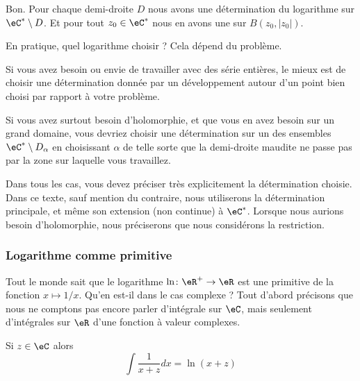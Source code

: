 Bon. Pour chaque demi-droite \( D\) nous avons une détermination du logarithme sur \( \eC^*\setminus D\). Et pour tout \( z_0\in \eC^*\) nous en avons une sur \( B(z_0,| z_0 |)\).

En pratique, quel logarithme choisir ? Cela dépend du problème.

Si vous avez besoin ou envie de travailler avec des série entières, le mieux est de choisir une détermination donnée par un développement autour d'un point bien choisi par rapport à votre problème.

Si vous avez surtout besoin d'holomorphie, et que vous en avez besoin sur un grand domaine, vous devriez choisir une détermination sur un des ensembles \( \eC^*\setminus D_{\alpha}\) en choisissant \( \alpha\) de telle sorte que la demi-droite maudite ne passe pas par la zone sur laquelle vous travaillez.

Dans tous les cas, vous devez préciser très explicitement la détermination choisie. Dans ce texte, sauf mention du contraire, nous utiliserons la détermination principale, et même son extension (non continue) à \( \eC^*\). Lorsque nous aurions besoin d'holomorphie, nous préciserons que nous considérons la restriction.

\subsubsection{Logarithme comme primitive}

Tout le monde sait que le logarithme \( \ln\colon \eR^+\to \eR\) est une primitive de la fonction \( x\mapsto 1/x\). Qu'en est-il dans le cas complexe ? Tout d'abord précisons que nous ne comptons pas encore parler d'intégrale sur \( \eC\), mais seulement d'intégrales sur \( \eR\) d'une fonction à valeur complexes.

\begin{proposition}     \label{PROPooNIJVooKueuYJ}
    Si \( z\in \eC\) alors
    \begin{equation}        \label{EQooAHYXooTPGXDS}
        \int\frac{1}{ x+z }dx=\ln(x+z)
    \end{equation}
\end{proposition}

